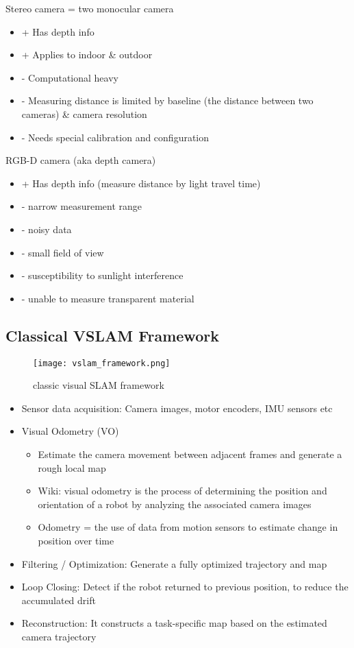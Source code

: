 \documentclass[main.tex]{subfiles}
\begin{document}
Stereo camera = two monocular camera
\begin{itemize}
\item + Has depth info
\item + Applies to indoor \& outdoor
\item - Computational heavy
\item - Measuring distance is limited by baseline (the distance between two cameras) \& camera resolution
\item - Needs special calibration and configuration
\end{itemize}

RGB-D camera (aka depth camera)
\begin{itemize}
\item + Has depth info (measure distance by light travel time)
\item - narrow measurement range
\item - noisy data
\item - small field of view
\item - susceptibility to sunlight interference
\item - unable to measure transparent material
\end{itemize}

\subsection{Classical VSLAM Framework}

\begin{figure}[!h]
  \centering
  \texttt{[image: vslam\_framework.png]}
  \caption{classic visual SLAM framework}
  \label{fig:vslam}
\end{figure}

\begin{itemize}
\item Sensor data acquisition: Camera images, motor encoders, IMU sensors etc
\item Visual Odometry (VO)
\begin{itemize}
	\item Estimate the camera movement between adjacent frames and generate a rough local map
	\item Wiki: visual odometry is the process of determining the position and orientation of a robot by analyzing the associated camera images
	\item Odometry = the use of data from motion sensors to estimate change in position over time
\end{itemize}
\item Filtering / Optimization: Generate a fully optimized trajectory and map
\item Loop Closing: Detect if the robot returned to previous position, to reduce the accumulated drift
\item Reconstruction: It constructs a task-specific map based on the estimated camera trajectory
\end{itemize}
\end{document}
